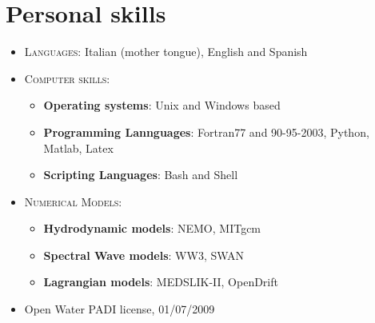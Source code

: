 \documentclass[a4paper, oneside, final]{scrartcl}
\begin{document}
\section{Personal skills}
\noindent
\normalsize

\begin{itemize}
\item \textsc{Languages:} Italian (mother tongue), English and Spanish \\

\item \textsc{Computer skills:}
        \begin{itemize}
           \item \textbf{Operating systems}: Unix and Windows based
           \item \textbf{Programming Lannguages}: Fortran77 and 90-95-2003, Python, Matlab, Latex
           \item \textbf{Scripting Languages}: Bash and Shell\\           
        \end{itemize}
\item \textsc{Numerical Models:}
        \begin{itemize}
           \item \textbf{Hydrodynamic models}: NEMO, MITgcm
           \item \textbf{Spectral Wave models}: WW3, SWAN
           \item \textbf{Lagrangian models}: MEDSLIK-II, OpenDrift\\           
        \end{itemize}                 
\item Open Water PADI license, 01/07/2009
\end{itemize}
\end{document}
